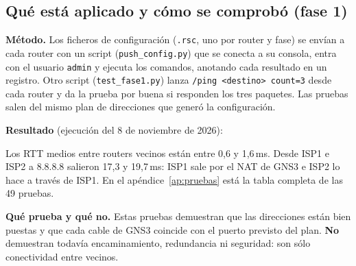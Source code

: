 \documentclass[11pt,a4paper]{article}
\newcommand{\cod}[1]{\texttt{#1}}
\begin{document}
\subsection{Qué está aplicado y cómo se comprobó (fase 1)}
\textbf{Método.} Los ficheros de configuración (\cod{.rsc}, uno por router y fase) se envían a cada router con un script (\cod{push\_config.py}) que se conecta a su consola, entra con el usuario \cod{admin} y ejecuta los comandos, anotando cada resultado en un registro. Otro script (\cod{test\_fase1.py}) lanza \cod{/ping <destino> count=3} desde cada router y da la prueba por buena si responden los tres paquetes. Las pruebas salen del mismo plan de direcciones que generó la configuración.

\textbf{Resultado} (ejecución del 8 de noviembre de 2026):

Los RTT medios entre routers vecinos están entre 0,6 y 1,6\,ms. Desde ISP1 e ISP2 a 8.8.8.8 salieron 17,3 y 19,7\,ms: ISP1 sale por el NAT de GNS3 e ISP2 lo hace a través de ISP1. En el apéndice~\ref{ap:pruebas} está la tabla completa de las 49 pruebas.

\textbf{Qué prueba y qué no.} Estas pruebas demuestran que las direcciones están bien puestas y que cada cable de GNS3 coincide con el puerto previsto del plan. \textbf{No} demuestran todavía encaminamiento, redundancia ni seguridad: son sólo conectividad entre vecinos.
\end{document}
